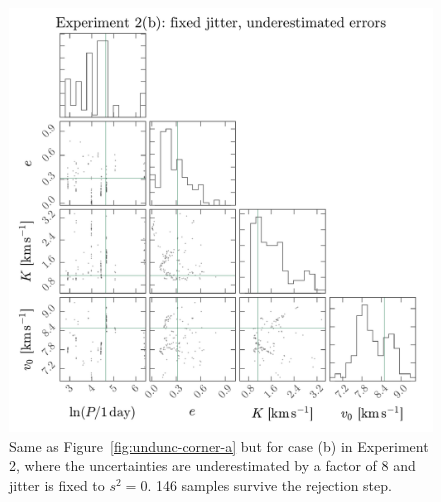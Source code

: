 \documentclass[manuscript, letterpaper]{aastex6}
\newcommand{\figname}{Figure}
\begin{document}
\begin{figure}[p]
\begin{center}
\includegraphics[width=\textwidth]{figures/undunc-corner-b.pdf}
\end{center}
\caption{%
Same as \figname~\ref{fig:undunc-corner-a} but for case (b) in Experiment 2, where the
uncertainties are underestimated by a factor of 8 and jitter is fixed to
$s^2 = 0$.
146 samples survive the rejection step.
\label{fig:undunc-corner-b}}
\end{figure}
\end{document}
